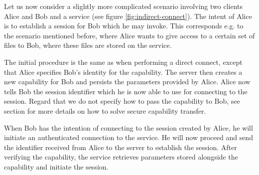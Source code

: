 Let us now consider a slightly more complicated scenario involving two clients Alice and Bob and a service (see figure \ref{fig:indirect-connect}).
The intent of Alice is to establish a session for Bob which he may invoke.
This corresponds e.g. to the scenario mentioned before, where Alice wants to give access to a certain set of files to Bob, where these files are stored on the service.

The initial procedure is the same as when performing a direct connect, except that Alice specifies Bob's identity for the capability.
The server then creates a new capability for Bob and persists the parameters provided by Alice.
Alice now tells Bob the session identifier which he is now able to use for connecting to the session.
Regard that we do not specify how to pass the capability to Bob, see section \label{sec:invoke-service} for more details on how to solve secure capability transfer.

When Bob has the intention of connecting to the session created by Alice, he will initiate an authenticated connection to the service.
He will now proceed and send the identifier received from Alice to the server to establish the session.
After verifying the capability, the service retrieves parameters stored alongside the capability and initiate the session.

